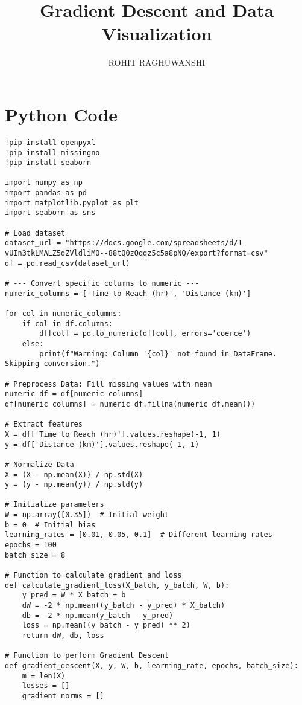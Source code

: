 \documentclass{article}
\begin{document}
\title{Gradient Descent and Data Visualization}
\author{ROHIT RAGHUWANSHI}
\maketitle

\section{Python Code}

\begin{verbatim}
!pip install openpyxl
!pip install missingno
!pip install seaborn

import numpy as np
import pandas as pd
import matplotlib.pyplot as plt
import seaborn as sns

# Load dataset 
dataset_url = "https://docs.google.com/spreadsheets/d/1-vUIn3tkLMALZ5dZVldliMO--88tQ0zQqqz5c5a8pNQ/export?format=csv"
df = pd.read_csv(dataset_url)

# --- Convert specific columns to numeric ---
numeric_columns = ['Time to Reach (hr)', 'Distance (km)']

for col in numeric_columns:
    if col in df.columns:
        df[col] = pd.to_numeric(df[col], errors='coerce')
    else:
        print(f"Warning: Column '{col}' not found in DataFrame. Skipping conversion.")

# Preprocess Data: Fill missing values with mean
numeric_df = df[numeric_columns]
df[numeric_columns] = numeric_df.fillna(numeric_df.mean())

# Extract features
X = df['Time to Reach (hr)'].values.reshape(-1, 1)
y = df['Distance (km)'].values.reshape(-1, 1)

# Normalize Data
X = (X - np.mean(X)) / np.std(X)
y = (y - np.mean(y)) / np.std(y)

# Initialize parameters
W = np.array([0.35])  # Initial weight
b = 0  # Initial bias
learning_rates = [0.01, 0.05, 0.1]  # Different learning rates
epochs = 100
batch_size = 8

# Function to calculate gradient and loss
def calculate_gradient_loss(X_batch, y_batch, W, b):
    y_pred = W * X_batch + b
    dW = -2 * np.mean((y_batch - y_pred) * X_batch)
    db = -2 * np.mean(y_batch - y_pred)
    loss = np.mean((y_batch - y_pred) ** 2)
    return dW, db, loss

# Function to perform Gradient Descent
def gradient_descent(X, y, W, b, learning_rate, epochs, batch_size):
    m = len(X)
    losses = []
    gradient_norms = []


\end{verbatim}
\end{document}
